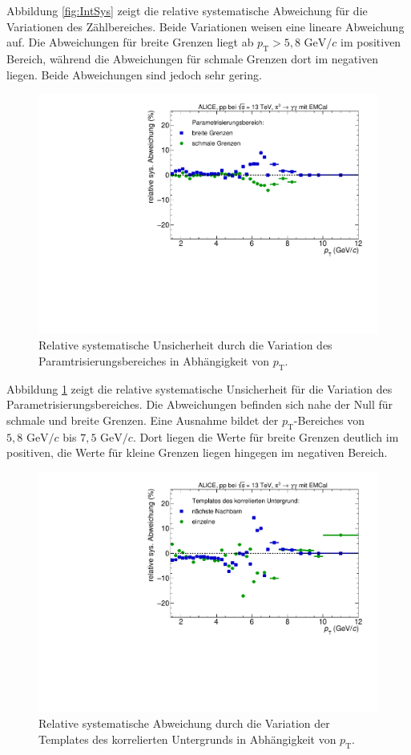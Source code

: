 \newline
Abbildung \ref{fig:IntSys} zeigt die relative systematische Abweichung für die Variationen des Zählbereiches.
Beide Variationen weisen eine lineare Abweichung auf.
Die Abweichungen für breite Grenzen liegt ab $p_\text{T} > 5,8 \text{ GeV}/c$ im positiven Bereich, während die Abweichungen für schmale Grenzen dort im negativen liegen.
Beide Abweichungen sind jedoch sehr gering.
\begin{figure}[t!]
\centering
\includegraphics[width=.65\linewidth]{YieldsSysUncerFitRange_Data_2016.pdf}
\caption{Relative systematische Unsicherheit durch die Variation des Paramtrisierungsbereiches in Abhängigkeit von $p_\text{T}$.}
\label{fig:ParamSys}
\end{figure}
\newline
Abbildung \ref{fig:ParamSys} zeigt die relative systematische Unsicherheit für die Variation des Parametrisierungsbereiches.
Die Abweichungen befinden sich nahe der Null für schmale und breite Grenzen.
Eine Ausnahme bildet der $p_\text{T}$-Bereiches von $5,8 \text{ GeV}/c$ bis $7,5 \text{ GeV}/c$.
Dort liegen die Werte für breite Grenzen deutlich im positiven, die Werte für kleine Grenzen liegen hingegen im negativen Bereich.
\begin{figure}[t!]
\centering
\includegraphics[width=.65\linewidth]{YieldsSysUncerBkgVariation_Data_2016.pdf}
\caption{Relative systematische Abweichung durch die Variation der Templates des korrelierten Untergrunds in Abhängigkeit von $p_\text{T}$.}
\label{fig:BkgSys}
\end{figure}
